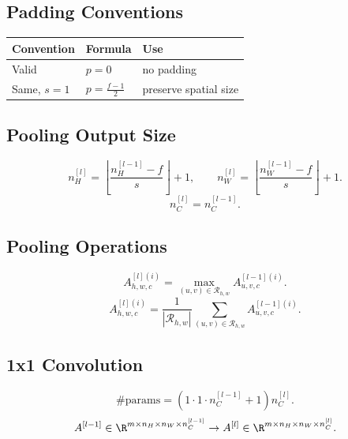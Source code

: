 \subsection{Padding Conventions}

\begin{center}
\begin{tabular}{lll}
\toprule
Convention & Formula & Use \\
\midrule
Valid & $p=0$ & no padding \\
Same, $s=1$ & $\displaystyle p=\frac{f-1}{2}$ & preserve spatial size \\
\bottomrule
\end{tabular}
\end{center}

\subsection{Pooling Output Size}

\[
n_H^{[l]}
=
\left\lfloor
\frac{
n_H^{[l-1]} - f
}{
s
}
\right\rfloor
+1,
\qquad
n_W^{[l]}
=
\left\lfloor
\frac{
n_W^{[l-1]} - f
}{
s
}
\right\rfloor
+1.
\]
\[
n_C^{[l]} = n_C^{[l-1]}.
\]

\subsection{Pooling Operations}

\[
A_{h,w,c}^{[l](i)}
=
\max_{(u,v)\in \mathcal{R}_{h,w}}
A_{u,v,c}^{[l-1](i)}.
\]
\[
A_{h,w,c}^{[l](i)}
=
\frac{1}{|\mathcal{R}_{h,w}|}
\sum_{(u,v)\in \mathcal{R}_{h,w}}
A_{u,v,c}^{[l-1](i)}.
\]

\subsection{1x1 Convolution}

\[
\#\mathrm{params}
=
(1 \cdot 1 \cdot n_C^{[l-1]} + 1)n_C^{[l]}.
\]
\[
A^{[l-1]}
\in
\R^{m \times n_H \times n_W \times n_C^{[l-1]}}
\to
A^{[l]}
\in
\R^{m \times n_H \times n_W \times n_C^{[l]}}.
\]

